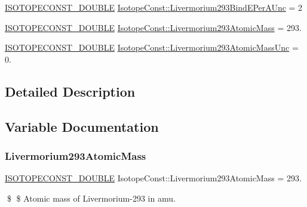 \begin{DoxyCompactItemize}
\item 
\mbox{\hyperlink{group___isotope_const-_macros_ga8f45a7272ce02c0b4c65c44636ed719a}{I\+S\+O\+T\+O\+P\+E\+C\+O\+N\+S\+T\+\_\+\+D\+O\+U\+B\+LE}} \mbox{\hyperlink{group___isotope_const-_livermorium-_lv293_gaad3f7c6239e608f7819ef8b06e84eea2}{Isotope\+Const\+::\+Livermorium293\+Bind\+E\+Per\+A\+Unc}} = 2
\item 
\mbox{\hyperlink{group___isotope_const-_macros_ga8f45a7272ce02c0b4c65c44636ed719a}{I\+S\+O\+T\+O\+P\+E\+C\+O\+N\+S\+T\+\_\+\+D\+O\+U\+B\+LE}} \mbox{\hyperlink{group___isotope_const-_livermorium-_lv293_gaa0bf30030cfca1dfe632fc581ef2ca5d}{Isotope\+Const\+::\+Livermorium293\+Atomic\+Mass}} = 293.
\item 
\mbox{\hyperlink{group___isotope_const-_macros_ga8f45a7272ce02c0b4c65c44636ed719a}{I\+S\+O\+T\+O\+P\+E\+C\+O\+N\+S\+T\+\_\+\+D\+O\+U\+B\+LE}} \mbox{\hyperlink{group___isotope_const-_livermorium-_lv293_gaf775cc4f31df0f57c93154ad458c956a}{Isotope\+Const\+::\+Livermorium293\+Atomic\+Mass\+Unc}} = 0.
\end{DoxyCompactItemize}


\subsection{Detailed Description}


\subsection{Variable Documentation}
\mbox{\label{group___isotope_const-_livermorium-_lv293_gaa0bf30030cfca1dfe632fc581ef2ca5d}} 
\subsubsection{\texorpdfstring{Livermorium293\+Atomic\+Mass}{Livermorium293AtomicMass}}
{\footnotesize\ttfamily \mbox{\hyperlink{group___isotope_const-_macros_ga8f45a7272ce02c0b4c65c44636ed719a}{I\+S\+O\+T\+O\+P\+E\+C\+O\+N\+S\+T\+\_\+\+D\+O\+U\+B\+LE}} Isotope\+Const\+::\+Livermorium293\+Atomic\+Mass = 293.}

\$ \$ Atomic mass of Livermorium-\/293 in amu. \mbox{\label{group___isotope_const-_livermorium-_lv293_gaf775cc4f31df0f57c93154ad458c956a}} 

